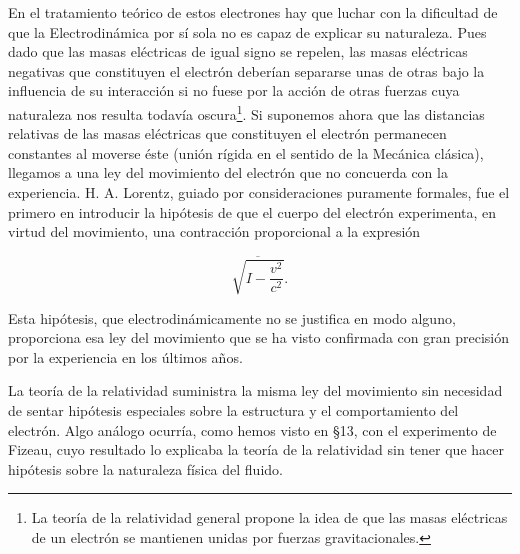 \documentclass[spanish]{book}
\begin{document}
En el tratamiento teórico de estos electrones hay que luchar con la dificultad de que la
Electrodinámica por sí sola no es capaz de explicar su naturaleza. Pues dado que las
masas eléctricas de igual signo se repelen, las masas eléctricas negativas que
constituyen el electrón deberían separarse unas de otras bajo la influencia de su
interacción si no fuese por la acción de otras fuerzas cuya naturaleza nos resulta todavía
oscura\footnote{La teoría de la relatividad general propone la idea de que las masas
eléctricas de un electrón se mantienen unidas por fuerzas gravitacionales.}. 
Si suponemos ahora que las distancias relativas de las masas eléctricas que
constituyen el electrón permanecen constantes al moverse éste (unión rígida en el
sentido de la Mecánica clásica), llegamos a una ley del movimiento del electrón que no
concuerda con la experiencia. H. A. Lorentz, guiado por consideraciones puramente
formales, fue el primero en introducir la hipótesis de que el cuerpo del electrón
experimenta, en virtud del movimiento, una contracción proporcional a la expresión

\[\overline{\sqrt{I-\frac{v^{2}}{c^{2}}}}.\] 

Esta hipótesis, que electrodinámicamente no se justifica en modo alguno,
proporciona esa ley del movimiento que se ha visto confirmada con gran precisión
por la experiencia en los últimos años.

La teoría de la relatividad suministra la misma ley del movimiento sin necesidad de
sentar hipótesis especiales sobre la estructura y el comportamiento del electrón. Algo
análogo ocurría, como hemos visto en \S 13, con el experimento de Fizeau, cuyo
resultado lo explicaba la teoría de la relatividad sin tener que hacer hipótesis sobre la
naturaleza física del fluido.
\end{document}
